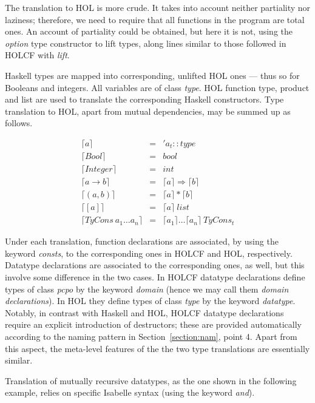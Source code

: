 \documentclass{llncs}
\begin{document}
The translation to HOL is more crude. It takes into account neither partiality
nor laziness; therefore, we need to require that all functions in the program
are total ones. An account of partiality could be obtained, but here it is
not, using the \emph{option} type constructor to lift types, along lines
similar to those followed in HOLCF with \emph{lift}.

Haskell types are mapped into corresponding, unlifted HOL ones --- thus so for
Booleans and integers. All variables are of class \emph{type}.  HOL function
type, product and list are used to translate the corresponding Haskell
constructors.  Type translation to HOL, apart from mutual dependencies, may be
summed up as follows.

$$\begin{array}{lcl}
  \lceil a \rceil & = & 'a_{t}::type \\
  \lceil Bool \rceil & = & bool \\
  \lceil Integer \rceil & = & int \\
  \lceil a \to b \rceil & = & \lceil a \rceil \Rightarrow \lceil b \rceil \\
  \lceil (a,b) \rceil & = & \lceil a \rceil * \lceil b \rceil \\
  \lceil [a] \rceil & = & \lceil a \rceil \ list \\
  \lceil TyCons \ a_{1} \ldots a_{n} \rceil & = & \lceil a_{1} \rceil \ldots \lceil a_{n} \rceil \ TyCons_{t} 
\end{array}$$

\noindent Under each translation, function declarations 
are associated, by using the keyword \emph{consts}, to the corresponding ones
in HOLCF and HOL, respectively. Datatype declarations are associated to the
corresponding ones, as well, but this involve some difference in the two
cases. In HOLCF datatype declarations define types of class \emph{pcpo} by the
keyword \emph{domain} (hence we may call them \emph{domain declarations}). In
HOL they define types of class \emph{type} by the keyword \emph{datatype}.
Notably, in contrast with Haskell and HOL, HOLCF datatype declarations require
an explicit introduction of destructors; these are provided automatically
according to the naming pattern in Section~\ref{section:nam}, point 4.  Apart
from this aspect, the meta-level features of the the two type translations are
essentially similar.

Translation of mutually recursive datatypes, as the one shown in the following
example, relies on specific Isabelle syntax (using the keyword \emph{and}).\\
\end{document}
